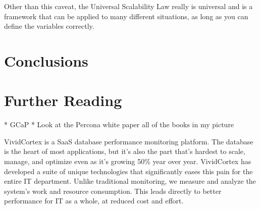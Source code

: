 \documentclass{vivid_layout}
\begin{document}
Other than this caveat, the Universal Scalability Law really is universal and is
a framework that can be applied to many different situations, as long as you can
define the variables correctly.

\section{Conclusions}



\section{Further Reading}

				    * GCaP
					     * Look at the Percona white paper
						  all of the books in my picture

\newpage

\begin{about}	%
VividCortex is a SaaS database performance monitoring platform. The database is the heart of most applications, but it's also the part that's hardest to scale, manage, and optimize even as it's growing 50\% year over year. VividCortex has developed a suite of unique technologies that significantly eases this pain for the entire IT department. Unlike traditional monitoring, we measure
and analyze the system's work and resource consumption. This leads directly to better performance for IT as a whole, at reduced cost and effort.
\end{about}
\makeresources	%
\end{document}
